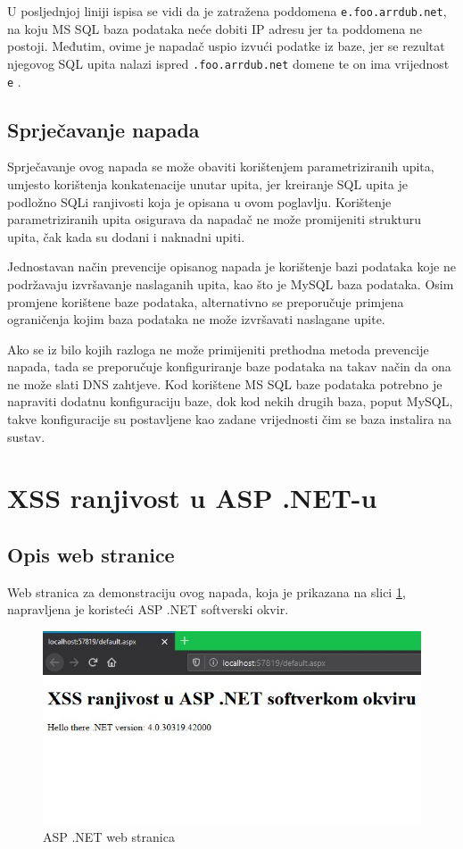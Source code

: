 \documentclass[12pt, oneside, onecolumn]{book}
\begin{document}
{U posljednjoj liniji ispisa se vidi da je zatražena poddomena \texttt{e.foo.arrdub.net}, na koju MS SQL baza podataka neće dobiti IP adresu jer ta poddomena ne postoji. Međutim, ovime je napadač uspio izvući podatke iz baze, jer se rezultat njegovog SQL upita nalazi ispred \texttt{.foo.arrdub.net} domene te on ima vrijednost \texttt{e} \cite{dnsextr}.

\subsection{Sprječavanje napada}
Sprječavanje ovog napada se može obaviti korištenjem parametriziranih upita, umjesto korištenja konkatenacije unutar upita, jer kreiranje SQL upita je podložno SQLi ranjivosti koja je opisana u ovom poglavlju. Korištenje parametriziranih upita osigurava da napadač ne može promijeniti strukturu upita, čak kada su dodani i naknadni upiti.

Jednostavan način prevencije opisanog napada je korištenje bazi podataka koje ne podržavaju izvršavanje naslaganih upita, kao što je MySQL baza podataka. Osim promjene korištene baze podataka, alternativno se preporučuje primjena ograničenja kojim baza podataka ne može izvršavati naslagane upite.

Ako se iz bilo kojih razloga ne može primijeniti prethodna metoda prevencije napada, tada se preporučuje konfiguriranje baze podataka na takav način da ona ne može slati DNS zahtjeve. Kod korištene MS SQL baze podataka potrebno je napraviti dodatnu konfiguraciju baze, dok kod nekih drugih baza, poput MySQL, takve konfiguracije su postavljene kao zadane vrijednosti čim se baza instalira na sustav.

\pagebreak

\section{XSS ranjivost u ASP .NET-u} \label{xss2}
\subsection{Opis web stranice}
Web stranica za demonstraciju ovog napada, koja je prikazana na slici \ref{fig:asp}, napravljena je koristeći ASP .NET softverski okvir.

\begin{figure}[H]
	\begin{center}
		\includegraphics[width=\textwidth]{asp.jpg}
		\caption{ASP .NET web stranica} \label{fig:asp}
	\end{center}
\end{figure}

}
\end{document}
